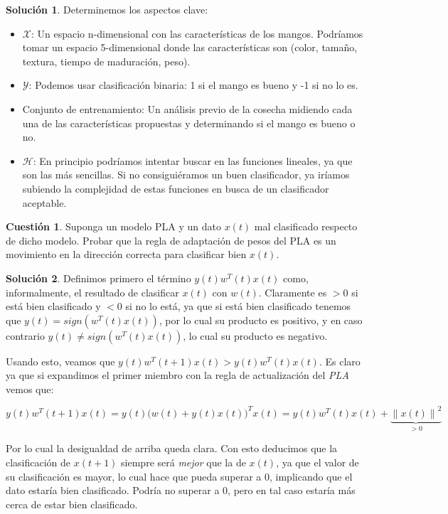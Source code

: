 \documentclass[a4paper, 11pt]{article}
\theoremstyle{definition}
\newtheorem{cuestion}{Cuestión}
\newtheorem*{solucion}{Solución}
\newcommand{\norm}[1]{\left\lVert#1\right\rVert}
\begin{document}
  \begin{solucion}
    Determinemos los aspectos clave:
    \begin{itemize}
      \item $\mathcal{X}$: Un espacio n-dimensional con las características de los mangos. Podríamos tomar un espacio 5-dimensional donde las características son (color, tamaño, textura, tiempo de maduración, peso).
      \item $\mathcal{Y}$: Podemos usar clasificación binaria: 1 si el mango es bueno y -1 si no lo es.
      \item Conjunto de entrenamiento: Un análisis previo de la cosecha midiendo cada una de las características propuestas y determinando si el mango es bueno o no.
      \item $\mathcal{H}$: En principio podríamos intentar buscar en las funciones lineales, ya que son las más sencillas. Si no consiguiéramos un buen clasificador, ya iríamos subiendo la complejidad de estas funciones en busca de un clasificador aceptable.
    \end{itemize}
  \end{solucion}

  \begin{cuestion}
  Suponga un modelo PLA y un dato $x(t)$ mal clasificado respecto de dicho modelo. Probar que la regla de adaptación de pesos del PLA es un movimiento en la dirección correcta para clasificar bien $x(t)$.

  \end{cuestion}

  \begin{solucion}
    Definimos primero el término $y(t)w^T(t)x(t)$ como, informalmente,  el resultado de clasificar $x(t)$ con $w(t)$. Claramente es $>0$ si está bien clasificado y $<0$ si no lo está, ya que si está bien clasificado tenemos que $y(t) = sign(w^T(t)x(t))$, por lo cual su producto es positivo, y en caso contrario $y(t) \neq sign(w^T(t)x(t))$, lo cual su producto es negativo.

    Usando esto, veamos que $y(t)w^T(t+1)x(t) > y(t)w^T(t)x(t)$. Es claro ya que      si expandimos el primer miembro con la regla de actualización del \emph{PLA} vemos que:

    \[
    y(t)w^T(t+1)x(t) = y(t){\big( w(t)+y(t)x(t) \big)}^T x(t) = y(t)w^T(t)x(t) + \underbrace{{\norm{x(t)}}^2}_{>0}
    \]

    Por lo cual la desigualdad de arriba queda clara. Con esto deducimos que la clasificación de $x(t+1)$ siempre será \emph{mejor} que la de $x(t)$, ya que el valor de su clasificación es mayor, lo cual hace que pueda superar a $0$, implicando que el dato estaría bien clasificado. Podría no superar a $0$, pero en tal caso estaría más cerca de estar bien clasificado.
  \end{solucion}
\end{document}

